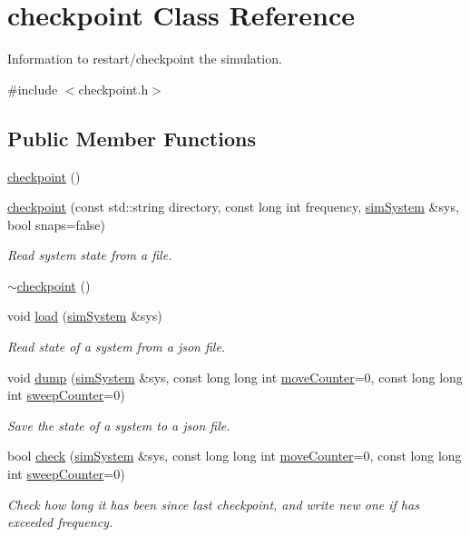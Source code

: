 \hypertarget{classcheckpoint}{\section{checkpoint Class Reference}
\label{classcheckpoint}
}


Information to restart/checkpoint the simulation.  




{\ttfamily \#include $<$checkpoint.\-h$>$}

\subsection*{Public Member Functions}
\begin{DoxyCompactItemize}
\item 
\hyperlink{classcheckpoint_a0c9fbc3decbdd8a0eedd43e4bef55583}{checkpoint} ()
\item 
\hyperlink{classcheckpoint_a581d523291838c5ec953752ad812cd9b}{checkpoint} (const std\-::string directory, const long int frequency, \hyperlink{classsim_system}{sim\-System} \&sys, bool snaps=false)
\begin{DoxyCompactList}\small\item\em Read system state from a file. \end{DoxyCompactList}\item 
\hyperlink{classcheckpoint_a953aa90982db63755a071332c296ea68}{$\sim$checkpoint} ()
\item 
void \hyperlink{classcheckpoint_a4f4795f365105a9f9a5913748ad84aa3}{load} (\hyperlink{classsim_system}{sim\-System} \&sys)
\begin{DoxyCompactList}\small\item\em Read state of a system from a json file. \end{DoxyCompactList}\item 
void \hyperlink{classcheckpoint_ac07a5bfeb5434d80a3024042f2203483}{dump} (\hyperlink{classsim_system}{sim\-System} \&sys, const long long int \hyperlink{classcheckpoint_a5ab49a355714da4874aba00eb03f701d}{move\-Counter}=0, const long long int \hyperlink{classcheckpoint_ad011ddbca1ea708321335b1b3ac67e07}{sweep\-Counter}=0)
\begin{DoxyCompactList}\small\item\em Save the state of a system to a json file. \end{DoxyCompactList}\item 
bool \hyperlink{classcheckpoint_ab9ca7cab3fd3c5dc35fe71977b81a69f}{check} (\hyperlink{classsim_system}{sim\-System} \&sys, const long long int \hyperlink{classcheckpoint_a5ab49a355714da4874aba00eb03f701d}{move\-Counter}=0, const long long int \hyperlink{classcheckpoint_ad011ddbca1ea708321335b1b3ac67e07}{sweep\-Counter}=0)
\begin{DoxyCompactList}\small\item\em Check how long it has been since last checkpoint, and write new one if has exceeded frequency. \end{DoxyCompactList}\end{DoxyCompactItemize}
